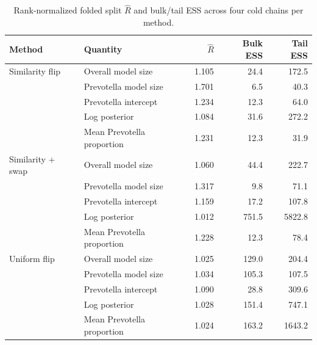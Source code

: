 \begin{table}[t]
\centering
\small
\caption{Rank-normalized folded split $\widehat R$ and bulk/tail ESS across four cold chains per method.}
\label{tab:real_data_scalar_diagnostics}
\renewcommand{\arraystretch}{0.9}
\fontsize{10}{11}\selectfont
\begin{tabular}{llrrr}
\toprule
Method & Quantity & $\widehat R$ & Bulk ESS & Tail ESS \\
\midrule
Similarity flip & Overall model size & 1.105 & 24.4 & 172.5 \\
 & Prevotella model size & 1.701 & 6.5 & 40.3 \\
 & Prevotella intercept & 1.234 & 12.3 & 64.0 \\
 & Log posterior & 1.084 & 31.6 & 272.2 \\
 & Mean Prevotella proportion & 1.231 & 12.3 & 31.9 \\
\addlinespace
Similarity + swap & Overall model size & 1.060 & 44.4 & 222.7 \\
 & Prevotella model size & 1.317 & 9.8 & 71.1 \\
 & Prevotella intercept & 1.159 & 17.2 & 107.8 \\
 & Log posterior & 1.012 & 751.5 & 5822.8 \\
 & Mean Prevotella proportion & 1.228 & 12.3 & 78.4 \\
\addlinespace
Uniform flip & Overall model size & 1.025 & 129.0 & 204.4 \\
 & Prevotella model size & 1.034 & 105.3 & 107.5 \\
 & Prevotella intercept & 1.090 & 28.8 & 309.6 \\
 & Log posterior & 1.028 & 151.4 & 747.1 \\
 & Mean Prevotella proportion & 1.024 & 163.2 & 1643.2 \\
\bottomrule
\end{tabular}
\end{table}
